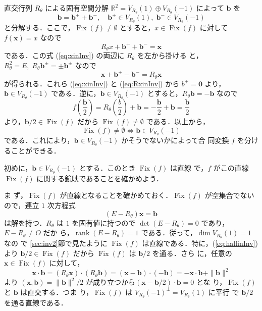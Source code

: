 \documentclass[11pt, uplatex, dvipdfmx, titlepage]{jsarticle}
\DeclareMathOperator{\Fix}{Fix}
\DeclareMathOperator{\rank}{rank}
\theoremstyle{definition}
\begin{document}
直交行列 $R_{\theta}$ による固有空間分解
$\mathbb{R}^2 = V_{R_{\theta}}(1) \oplus V_{R_{\theta}}(-1)$ によって $\bm{b}$
を
\begin{equation}\label{eq:eigendecomp2}
  \bm{b} = \bm{b}^{+} + \bm{b}^{-}, \quad \bm{b}^{+} \in V_{R_{\theta}}(1), \; \bm{b}^{-} \in V_{R_{\theta}}(-1)
\end{equation}
と分解する．ここで，$\Fix(f) \neq \emptyset$ とすると，$x \in \Fix(f)$
に対して $f(\bm{x}) = {x}$ なので
\begin{equation}\label{eq:xinInv}
  R_{\theta}x +\bm{b}^{+} + \bm{b}^{-} = \bm{x}
\end{equation}
である．この式 (\ref{eq:xinInv}) の両辺に $R_{\theta}$ を左から掛ける
と，$R_{\theta}^2=E, \; R_{\theta} \bm{b}^{\pm} = \pm \bm{b}^{\pm}$ なので
\begin{equation}\label{eq:RxinInv}
  \bm{x}+\bm{b}^{+}-\bm{b}^{-}=R_{\theta}\bm{x} 
\end{equation}
が得られる．これら (\ref{eq:xinInv}) と (\ref{eq:RxinInv}) から $b^{+}
= \bm{0}$ より，$\bm{b} \in V_{R_{\theta}}(-1)$
である．逆に，$\bm{b} \in V_{R_{\theta}}(-1)$ とすると，$R_{\theta}\bm{b}
= -\bm{b}$ なので
\begin{equation}\label{eq:halfinInv}
  f\left(\frac{\bm{b}}{2}\right) = R_{\theta}\left(\frac{b}{2}\right) + \bm{b}
  = -\frac{\bm{b}}{2}+\bm{b} = \frac{\bm{b}}{2}
\end{equation}
より，$\bm{b}/2 \in \Fix(f)$ だから $\Fix(f) \neq \emptyset$ である．以上から，
\[
  \Fix(f) \neq \emptyset \Leftrightarrow \bm{b} \in V_{R_{\theta}}(-1)
\]
である．これにより，$\bm{b} \in V_{R_{\theta}}(-1)$ かそうでないかによって合
同変換 $f$ を分けることができる．


初めに，$\bm{b} \in V_{R_{\theta}}(-1)$ とする．このとき $\Fix(f)$ は直線
で，$f$ がこの直線 $\Fix(f)$ に関する鏡映であることを確かめよう．

ま
ず，$\Fix(f)$ が直線となることを確かめておく．$\Fix(f)$ が空集合でない
ので，連立 $1$ 次方程式
\[
  (E-R_{\theta})\bm{x} = \bm{b}
\]
は解を持つ．$R_{\theta}$ は $1$ を固有値に持つので $\det
(E-R_{\theta}) = 0$ であり，$E-R_{\theta} \neq O$ だか
ら，$\rank(E-R_{\theta})=1$ である．従って，$\dim V_{R_{\theta}}(1)=1$ なの
で \ref{sec:inv2}節で見たように $\Fix(f)$ は直線である．特に，(\ref{eq:halfinInv})
より $\bm{b}/2 \in \Fix(f)$ だから $\Fix(f)$ は $\bm{b}/2$ を通る．さら
に，任意の $\bm{x} \in \Fix(f)$ に対して，
\[
  \bm{x} \cdot \bm{b} = (R_{\theta}\bm{x}) \cdot  (R_{\theta}\bm{b}) =
  (\bm{x}-\bm{b})\cdot (-\bm{b}) = -\bm{x}\cdot \bm{b}+\|\bm{b}\|^2
\]
より $(\bm{x}, \bm{b}) = \|\bm{b}\|^2/2$
が成り立つから$\left( \bm{x}-\bm{b}/2\right) \cdot  \bm{b}=0$ とな
り，$\Fix(f)$ と $\bm{b}$ は直交する．つま
り，$\Fix(f)$ は $V_{R_{\theta}}(-1)^{\perp}=V_{R_{\theta}}(1)$ に平行
で $\bm{b}/2$ を通る直線である．
\end{document}
